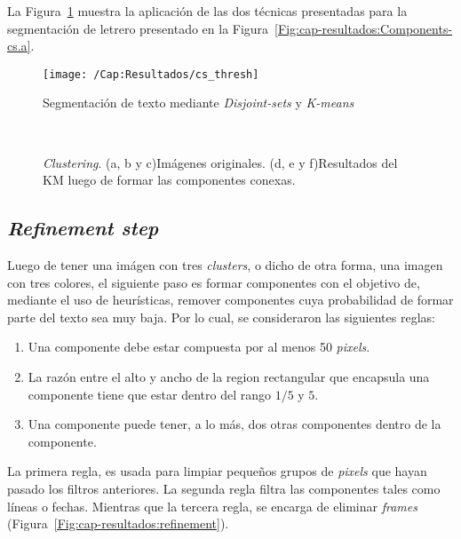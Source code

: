 La Figura~\ref{Fig:cap-resultados:thresh} muestra la aplicación de las dos 
técnicas presentadas para la segmentación de letrero presentado en la
Figura~\ref{Fig:cap-resultados:Components-cs.a}.
\begin{figure}[h!]
	\centering
	\texttt{[image: /Cap:Resultados/cs\_thresh]}
	\caption{Segmentación de texto mediante \textit{Disjoint-sets} y \textit{K-means}}
	\label{Fig:cap-resultados:thresh}
\end{figure}

\begin{figure}[h!]
  \centering
   { }
   { }
   \\
   { }
   { }
  \caption[\textit{Clustering}]{\textit{Clustering}. (a, b y c)Imágenes 
  originales. (d, e y f)Resultados del KM luego de formar las componentes
conexas.}
  \label{Fig:cap-resultados:km}
\end{figure}

\subsection{\textit{Refinement step}}
Luego de tener una imágen con tres \textit{clusters}, o dicho de otra forma,
una imagen con tres colores, el siguiente paso es formar componentes con el
objetivo de, mediante el uso de heurísticas, remover componentes cuya
probabilidad de formar parte del texto sea muy baja. Por lo cual, se
consideraron las siguientes reglas:
\begin{enumerate}
	\item Una componente debe estar compuesta por al menos 50 \textit{pixels}.
	\item La razón entre el alto y ancho de la region rectangular que encapsula 
	una componente tiene que estar dentro del rango $1/5$ y $5$.
	\item Una componente puede tener, a lo más, dos otras componentes dentro de 
	la componente.
\end{enumerate}

La primera regla, es usada para limpiar pequeños grupos de \textit{pixels} que hayan
pasado los filtros anteriores. La segunda regla filtra las componentes tales
como líneas o fechas. Mientras que la tercera regla, se encarga de eliminar
\textit{frames} (Figura~\ref{Fig:cap-resultados:refinement}).

